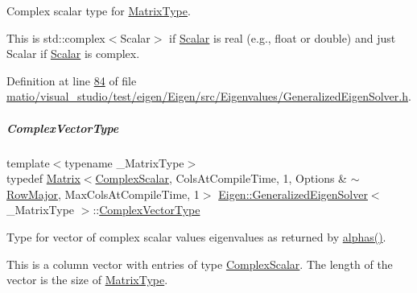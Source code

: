 Complex scalar type for \hyperlink{group___eigenvalues___module_a56f4b9823bb9a267de3aaf48428cd247}{Matrix\+Type}. 

This is {\ttfamily std\+::complex$<$\+Scalar$>$} if \hyperlink{group___eigenvalues___module_afb318d0b097ff8dd5a7410d31317ca47}{Scalar} is real (e.\+g., {\ttfamily float} or {\ttfamily double}) and just {\ttfamily Scalar} if \hyperlink{group___eigenvalues___module_afb318d0b097ff8dd5a7410d31317ca47}{Scalar} is complex. 

Definition at line \hyperlink{matio_2visual__studio_2test_2eigen_2_eigen_2src_2_eigenvalues_2_generalized_eigen_solver_8h_source_l00084}{84} of file \hyperlink{matio_2visual__studio_2test_2eigen_2_eigen_2src_2_eigenvalues_2_generalized_eigen_solver_8h_source}{matio/visual\+\_\+studio/test/eigen/\+Eigen/src/\+Eigenvalues/\+Generalized\+Eigen\+Solver.\+h}.

\mbox{\label{group___eigenvalues___module_acfd144329aca76882069da2fc5d53ef5}} 
\subparagraph{\texorpdfstring{Complex\+Vector\+Type}{ComplexVectorType}\hspace{0.1cm}{\footnotesize\ttfamily [1/2]}}
{\footnotesize\ttfamily template$<$typename \+\_\+\+Matrix\+Type$>$ \\
typedef \hyperlink{group___core___module_class_eigen_1_1_matrix}{Matrix}$<$\hyperlink{group___eigenvalues___module_abdec07af91db1345bb4c74066e3d0ea7}{Complex\+Scalar}, Cols\+At\+Compile\+Time, 1, Options \& $\sim$\hyperlink{group__enums_ggaacded1a18ae58b0f554751f6cdf9eb13acfcde9cd8677c5f7caf6bd603666aae3}{Row\+Major}, Max\+Cols\+At\+Compile\+Time, 1$>$ \hyperlink{group___eigenvalues___module_class_eigen_1_1_generalized_eigen_solver}{Eigen\+::\+Generalized\+Eigen\+Solver}$<$ \+\_\+\+Matrix\+Type $>$\+::\hyperlink{group___eigenvalues___module_acfd144329aca76882069da2fc5d53ef5}{Complex\+Vector\+Type}}



Type for vector of complex scalar values eigenvalues as returned by \hyperlink{group___eigenvalues___module_a82b1bc41267f46e5c5899d5b084a73bb}{alphas()}. 

This is a column vector with entries of type \hyperlink{group___eigenvalues___module_abdec07af91db1345bb4c74066e3d0ea7}{Complex\+Scalar}. The length of the vector is the size of \hyperlink{group___eigenvalues___module_a56f4b9823bb9a267de3aaf48428cd247}{Matrix\+Type}. 

